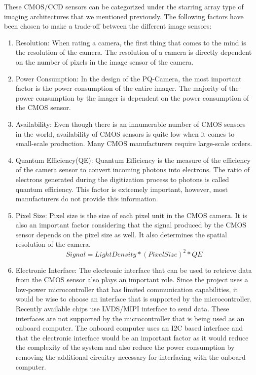 These CMOS/CCD sensors can be categorized under the starring array type of imaging architectures that we mentioned previously. The following factors have been chosen to  make a trade-off between the different image sensors:
\begin{enumerate}
\item Resolution: When rating a camera, the first thing that comes to the mind is the resolution of the camera. The resolution of a camera is directly dependent on the number of pixels in the image sensor of the camera. 
\item Power Consumption: In the design of the PQ-Camera, the most important factor is the power consumption of the entire imager. The majority of the power consumption by the imager is dependent on the power consumption of the CMOS sensor. 
\item Availability: Even though there is an innumerable number of CMOS sensors in the world, availability of CMOS sensors is quite low when it comes to small-scale production. Many CMOS manufacturers require large-scale orders.
\item Quantum Efficiency(QE): Quantum Efficiency is the measure of the efficiency of the camera sensor to convert incoming photons into electrons. The ratio of electrons generated during the digitization process to photons is called quantum efficiency. This factor is extremely important, however, most manufacturers do not provide this information.
\item Pixel Size: Pixel size is the size of each pixel unit in the CMOS camera. It is also an important factor considering that the signal produced by the CMOS sensor depends on the pixel size as well. It also determines the spatial resolution of the camera.
\begin{equation}
Signal = Light Density * (Pixel Size)^2 * QE
\end{equation}
\item Electronic Interface: The electronic interface that can be used to retrieve data from the CMOS sensor also plays an important role. Since the project uses a low-power microcontroller that has limited communication capabilities, it would be wise to choose an interface that is supported by the microcontroller. Recently available chips use LVDS/MIPI interface to send data. These interfaces are not supported by the microcontroller that is being used as an onboard computer. The onboard computer uses an I2C based interface and that the electronic interface would be an important factor as it would reduce the complexity of the system and also reduce the power consumption by removing the additional circuitry necessary for interfacing with the onboard computer.


\end{enumerate}
